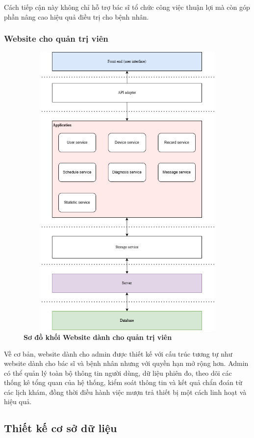 Cách tiếp cận này không chỉ hỗ trợ bác sĩ tổ chức công việc thuận lợi mà còn góp phần nâng cao hiệu quả điều trị cho bệnh nhân.

\subsubsection{Website cho quản trị viên}
\begin{figure}[H]
	\centering
	\includegraphics[width=12cm,height=15cm]{Images/System/fmECG_architecture-Admin.drawio.png}
	\caption[Sơ đồ khối Website dành cho quản trị viên]{\bfseries \fontsize{12pt}{0pt}\selectfont Sơ đồ khối Website dành cho quản trị viên}
	\label{fmECG_architecture-Admin} %
\end{figure}
Về cơ bản, website dành cho admin được thiết kế với cấu trúc tương tự như website dành cho bác sĩ và bệnh nhân nhưng với quyền hạn mở rộng hơn.
Admin có thể quản lý toàn bộ thông tin người dùng, dữ liệu phiên đo, theo dõi các thống kê tổng quan của hệ thống, kiểm soát thông tin và kết quả chẩn đoán từ các lịch khám,
đồng thời điều hành việc mượn trả thiết bị một cách linh hoạt và hiệu quả.

\subsection{Thiết kế cơ sở dữ liệu}

